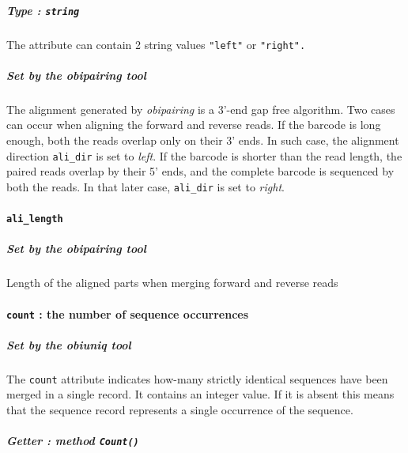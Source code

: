\documentclass[
  letterpaper,
  DIV=11,
  numbers=noendperiod]{scrreprt}
\let\oldparagraph\paragraph
\renewcommand{\paragraph}[1]{\oldparagraph{#1}\mbox{}}
\let\oldsubparagraph\subparagraph
\renewcommand{\subparagraph}[1]{\oldsubparagraph{#1}\mbox{}}
\begin{document}
\hypertarget{type-string}{%
\subparagraph{\texorpdfstring{Type :
\texttt{string}}{Type : string}}\label{type-string}}

The attribute can contain 2 string values \texttt{"left"} or
\texttt{"right".}

\hypertarget{set-by-the-obipairing-tool}{%
\subparagraph{\texorpdfstring{Set by the \emph{obipairing}
tool}{Set by the obipairing tool}}\label{set-by-the-obipairing-tool}}

The alignment generated by \emph{obipairing} is a 3'-end gap free
algorithm. Two cases can occur when aligning the forward and reverse
reads. If the barcode is long enough, both the reads overlap only on
their 3' ends. In such case, the alignment direction \texttt{ali\_dir}
is set to \emph{left}. If the barcode is shorter than the read length,
the paired reads overlap by their 5' ends, and the complete barcode is
sequenced by both the reads. In that later case, \texttt{ali\_dir} is
set to \emph{right}.

\hypertarget{ali_length}{%
\paragraph{\texorpdfstring{\texttt{ali\_length}}{ali\_length}}\label{ali_length}}

\hypertarget{set-by-the-obipairing-tool-1}{%
\subparagraph{\texorpdfstring{Set by the \emph{obipairing}
tool}{Set by the obipairing tool}}\label{set-by-the-obipairing-tool-1}}

Length of the aligned parts when merging forward and reverse reads

\hypertarget{count-the-number-of-sequence-occurrences}{%
\paragraph{\texorpdfstring{\texttt{count} : the number of sequence
occurrences}{count : the number of sequence occurrences}}\label{count-the-number-of-sequence-occurrences}}

\hypertarget{set-by-the-obiuniq-tool}{%
\subparagraph{\texorpdfstring{Set by the \emph{obiuniq}
tool}{Set by the obiuniq tool}}\label{set-by-the-obiuniq-tool}}

The \texttt{count} attribute indicates how-many strictly identical
sequences have been merged in a single record. It contains an integer
value. If it is absent this means that the sequence record represents a
single occurrence of the sequence.

\hypertarget{getter-method-count}{%
\subparagraph{\texorpdfstring{Getter : method
\texttt{Count()}}{Getter : method Count()}}\label{getter-method-count}}
\end{document}

